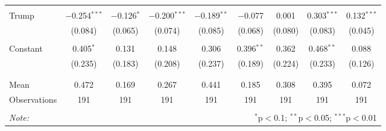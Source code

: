 \begin{tabular}{@{\extracolsep{5pt}}lcccccccc}
  & & & & & & & & \\ 
 Trump & $-$0.254$^{***}$ & $-$0.126$^{*}$ & $-$0.200$^{***}$ & $-$0.189$^{**}$ & $-$0.077 & 0.001 & 0.303$^{***}$ & 0.132$^{***}$ \\ 
  & (0.084) & (0.065) & (0.074) & (0.085) & (0.068) & (0.080) & (0.083) & (0.045) \\ 
  & & & & & & & & \\ 
 Constant & 0.405$^{*}$ & 0.131 & 0.148 & 0.306 & 0.396$^{**}$ & 0.362 & 0.468$^{**}$ & 0.088 \\ 
  & (0.235) & (0.183) & (0.208) & (0.237) & (0.189) & (0.224) & (0.233) & (0.126) \\ 
  & & & & & & & & \\ 
\hline \\[-1.8ex] 
Mean & 0.472 & 0.169 & 0.267 & 0.441 & 0.185 & 0.308 & 0.395 & 0.072 \\ 
Observations & 191 & 191 & 191 & 191 & 191 & 191 & 191 & 191 \\ 
\hline 
\hline \\[-1.8ex] 
\textit{Note:}  & \multicolumn{8}{r}{$^{*}$p$<$0.1; $^{**}$p$<$0.05; $^{***}$p$<$0.01} \\ 
\end{tabular} 
